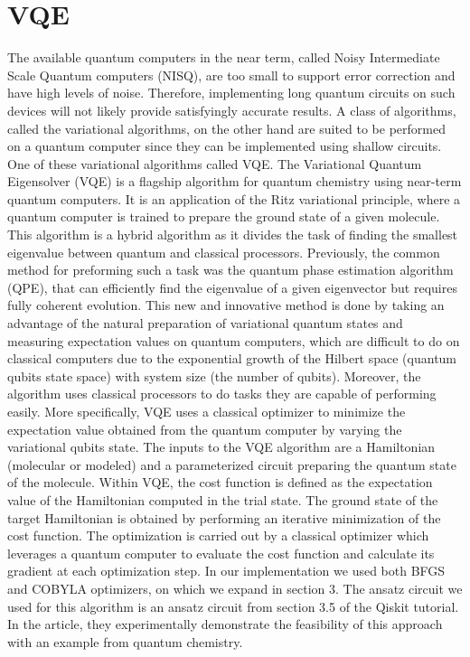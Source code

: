 \documentclass[12pt, a4paper]{article}
\begin{document}
    \section{VQE}
    The available quantum computers in the near term, called Noisy Intermediate Scale Quantum computers (NISQ), are too small to support error correction and have high levels of noise. Therefore, implementing long quantum circuits on such devices will not likely provide satisfyingly accurate results. A class of algorithms, called the variational algorithms, on the other hand are suited to be performed on a quantum computer since they can be implemented using shallow circuits.\\
    One of these variational algorithms called VQE.
    The Variational Quantum Eigensolver (VQE) is a flagship algorithm for quantum chemistry using near-term quantum computers.
    It is an application of the Ritz variational principle, where a quantum computer is trained to prepare the ground state of a given molecule. This algorithm is a hybrid algorithm as it divides the task of finding the smallest eigenvalue between quantum and classical processors. Previously, the common method for preforming such a task was the quantum phase estimation algorithm (QPE), that can efficiently find the eigenvalue of a given eigenvector but requires fully coherent evolution. This new and innovative method is done by taking an advantage of the natural preparation of variational quantum states and measuring expectation values on quantum computers, which are difficult to do on classical computers due to the exponential growth of the Hilbert space (quantum qubits state space) with system size (the number of qubits). Moreover, the algorithm uses classical processors to do tasks they are capable of performing easily. More specifically, VQE uses a classical optimizer to minimize the expectation value obtained from the quantum computer by varying the variational qubits state.
    The inputs to the VQE algorithm are a Hamiltonian (molecular or modeled) and a parameterized circuit preparing the quantum state of the molecule. Within VQE, the cost function is defined as the expectation value of the Hamiltonian computed in the trial state. The ground state of the target Hamiltonian is obtained by performing an iterative minimization of the cost function. The optimization is carried out by a classical optimizer which leverages a quantum computer to evaluate the cost function and calculate its gradient at each optimization step. In our implementation we used both BFGS and COBYLA optimizers, on which we expand in section 3. The ansatz circuit we used for this algorithm is an ansatz circuit from section 3.5 of the Qiskit tutorial. In the article, they experimentally demonstrate the feasibility of this approach with an example from quantum chemistry.
\end{document}
